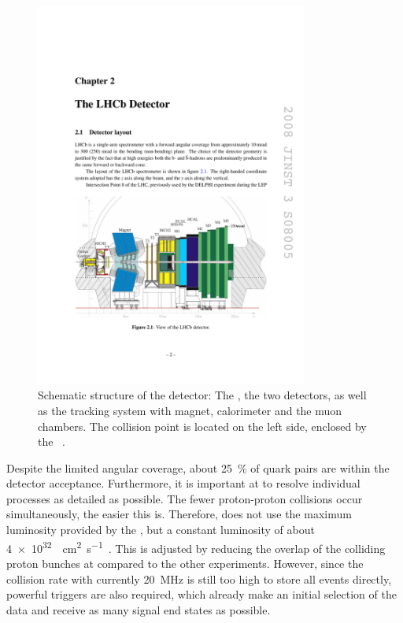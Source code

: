 \begin{figure}[tbp]
    \centering
    \includegraphics[width=0.8\textwidth]{05lhcb/figs/detector.pdf}
    \caption{Schematic structure of the \lhcb detector: The \velo, the two \rich detectors, as well as the tracking system with magnet, calorimeter and the muon chambers.
    The collision point is located on the left side, enclosed by the \velo~\cite{Alves:2008zz}.}
    \label{fig:lhcbdetector}
\end{figure}
Despite the limited angular coverage, about \SI{25}{\percent} of \bbbar quark pairs are within the detector acceptance.
Furthermore, it is important at \lhcb to resolve individual processes as detailed as possible.
The fewer proton-proton collisions occur simultaneously, the easier this is.
Therefore, \lhcb does not use the maximum luminosity provided by the \lhc, but a constant luminosity of about \SI{4e32}{\per\cm\squared\per\second}~\cite{LHC_statistic}.
This is adjusted by reducing the overlap of the colliding proton bunches at \lhcb compared to the other experiments.
However, since the collision rate with currently \SI{20}{\mega\hertz} is still too high to store all events directly, powerful triggers are also required, which already make an initial selection of the data and receive as many signal end states as possible.
